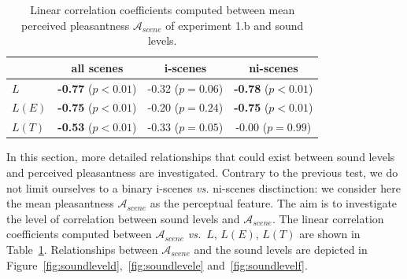 \documentclass[12pt]{elsarticle}
\newcommand{\vs}{\emph{vs.}}
\begin{document}
\begin{table}[t]
\centering
\begin{tabular}{l c c c}
               & all scenes                & i-scenes          & ni-scenes    \\
\hline
$L$            & \textbf{-0.77} ($p<0.01$) & -0.32 ($p=0.06$)  & \textbf{-0.78} ($p<0.01$)\\
$L(E)$         & \textbf{-0.75} ($p<0.01$) & -0.20 ($p=0.24$)  & \textbf{-0.75} ($p<0.01$)\\
$L(T)$         & \textbf{-0.53} ($p<0.01$) & -0.33 ($p=0.05$)  &  -0.00 ($p=0.99$) \\
\hline
\end{tabular}
\vspace{0.5mm}
\caption{Linear correlation coefficients computed between mean perceived pleasantness $\mathcal{A}_{scene}$ of experiment 1.b and sound levels.}
\label{tab:corrStructA}
\end{table}


In this section, more detailed relationships that could exist between sound levels and perceived pleasantness are investigated. Contrary to the previous test, we do not limit ourselves to a binary i-scenes \emph{vs.} ni-scenes disctinction: we consider here the mean pleasantness $\mathcal{A}_{scene}$ as the perceptual feature. The aim is to investigate the level of correlation between sound levels and $\mathcal{A}_{scene}$. The linear correlation coefficients computed between $\mathcal{A}_{scene}$ \vs~$L$, $L(E)$, $L(T)$ are shown in Table~\ref{tab:corrStructA}. Relationships between $\mathcal{A}_{scene}$ and the sound levels are depicted in Figure~\ref{fig:soundleveld},~\ref{fig:soundlevele} and~\ref{fig:soundlevelf}.
\end{document}
